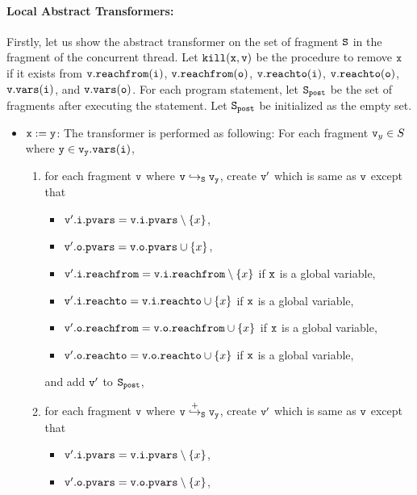 \paragraph{Local Abstract Transformers:} Firstly, let us show the abstract transformer on the set of fragment $\tt S$ in the fragment of the concurrent thread. Let $\tt kill(x,v)$ be the procedure to remove $\tt x$ if it exists from $\tt v.{\tt reachfrom}(\tt i)$, $\tt v.{\tt reachfrom}(\tt o)$, $\tt v.{\tt reachto}(\tt i)$, $\tt v.{\tt reachto}(\tt o)$, $\tt v.{\tt vars}(\tt i)$, and $\tt v.{\tt vars}(\tt o)$. For each program statement, let $\tt S_{post}$ be the set of fragments after executing the statement. Let $\tt S_{post}$ be initialized as the empty set.
\begin{itemize}

\item ${\tt x := y}$: The transformer is performed as following: For each fragment $\mathtt{v}_y \in S$ where $\tt y \in \mathtt{v}_y.{\tt vars}(\tt i)$,
\begin{enumerate}
\item  for each fragment $\tt v$ where $\tt v \hookrightarrow_S \mathtt{v}_y$, create $\tt v'$ which is same as $\tt v$ except that
\begin{itemize}
\item $\mathtt{v}'.\mathtt{i}.\mathtt{pvars} = \mathtt{v}.\mathtt{i}.\mathtt{pvars} \setminus \left\{x\right\}$,
\item $\mathtt{v}'.\mathtt{o}.\mathtt{pvars} = \mathtt{v}.\mathtt{o}.\mathtt{pvars} \cup \left\{x\right\}$,
\item $\mathtt{v}'.\mathtt{i}.\mathtt{reachfrom} = \mathtt{v}.\mathtt{i}.\mathtt{reachfrom} \setminus \left\{x\right\}$ if $\tt x$ is a global variable,
\item $\mathtt{v}'.\mathtt{i}.\mathtt{reachto} = \mathtt{v}.\mathtt{i}.\mathtt{reachto} \cup \left\{x\right\}$ if $\tt x$ is a global variable,
 \item $\mathtt{v}'.\mathtt{o}.\mathtt{reachfrom} = \mathtt{v}.\mathtt{o}.\mathtt{reachfrom} \cup \left\{x\right\}$ if $\tt x$ is a global variable,
\item $\mathtt{v}'.\mathtt{o}.\mathtt{reachto} = \mathtt{v}.\mathtt{o}.\mathtt{reachto} \cup \left\{x\right\}$ if $\tt x$ is a global variable,
\end{itemize}
and add $\tt v'$ to $\tt S_{post}$,
\item for each fragment $\tt v$ where $\tt v \overset{+}\hookrightarrow_S \mathtt{v}_y$, create $\tt v'$ which is same as $\tt v$ except that
\begin{itemize}
\item $\mathtt{v}'.\mathtt{i}.\mathtt{pvars} = \mathtt{v}.\mathtt{i}.\mathtt{pvars} \setminus \left\{x\right\}$,
\item $\mathtt{v}'.\mathtt{o}.\mathtt{pvars} = \mathtt{v}.\mathtt{o}.\mathtt{pvars} \setminus \left\{x\right\}$,

\end{itemize}
\end{enumerate}
\end{itemize}
